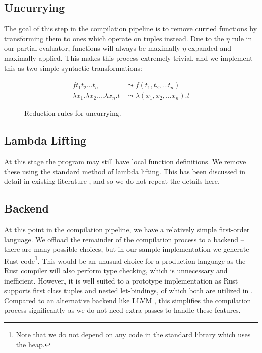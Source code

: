 \documentclass[runningheads]{llncs}
\begin{document}
\subsection{Uncurrying}

The goal of this step in the compilation pipeline is to remove curried functions by transforming them to ones which operate on tuples instead. Due to the $\eta$ rule in our partial evaluator, functions will always be maximally $\eta$-expanded and maximally applied. This makes this process extremely trivial, and we implement this as two simple syntactic transformations:

\begin{figure*}[h]
  \begin{minipage}[c]{\textwidth}
    \begin{align*}
      f t_1 t_2 \ldots t_n &\leadsto f(t_1, t_2, \ldots t_n) \\
      \lambda x_1. \lambda x_2. \ldots \lambda x_n. t &\leadsto \lambda (x_1, x_2, \ldots x_n). t
    \end{align*}
  \end{minipage}

  \caption{Reduction rules for uncurrying.}
  \label{fig:uncurrying-rules}
\end{figure*}

\subsection{Lambda Lifting}

At this stage the program may still have local function definitions. We remove these using the standard method of lambda lifting. This has been discussed in detail in existing literature \cite{danvy2002lambda,morazan2008optimal}, and so we do not repeat the details here.

\subsection{Backend}

At this point in the compilation pipeline, we have a relatively simple first-order language. We offload the remainder of the compilation process to a backend -- there are many possible choices, but in our sample implementation we generate Rust code\footnote{Note that we do not depend on any code in the standard library which uses the heap.}. This would be an unusual choice for a production language as the Rust compiler will also perform type checking, which is unnecessary and inefficient. However, it is well suited to a prototype implementation as Rust supports first class tuples and nested let-bindings, of which both are utilized in \core{}. Compared to an alternative backend like LLVM \cite{lattner2004llvm}, this simplifies the compilation process significantly as we do not need extra passes to handle these features.
\end{document}
